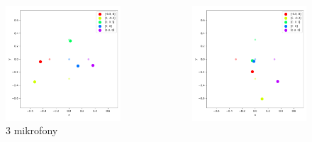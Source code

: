 \begin{frame}{}
    \begin{columns}
        \begin{column}{0.5\textwidth}
            \begin{figure}
                \centering
                \includegraphics[width=\textwidth]{../pics/mult_lat_2d_num/positions_3_mean.png}
                \caption{3 mikrofony}
            \end{figure}
        \end{column}
        \begin{column}{0.5\textwidth}
            \begin{figure}
                \centering
                \includegraphics[width=\textwidth]{../pics/mult_lat_2d_num/positions_4_mean.png}

\end{figure}
\end{column}
\end{columns}
\end{frame}
